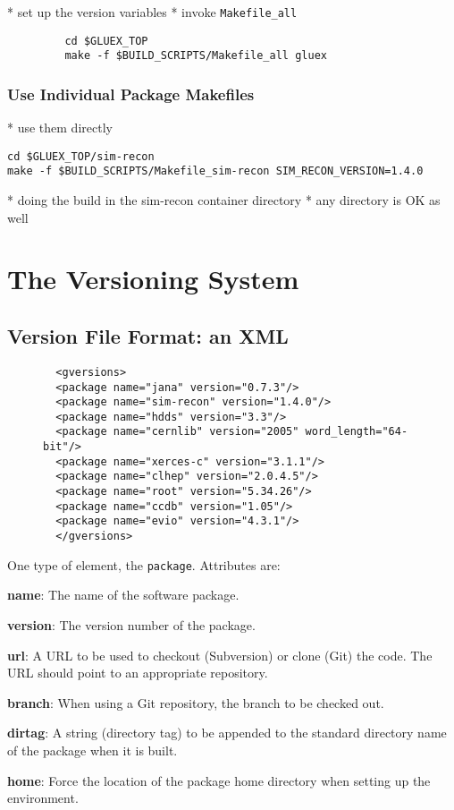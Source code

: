\documentclass[12pt]{article}
\begin{document}
* set up the version variables
* invoke {\tt Makefile\_all}

\begin{verbatim}
         cd $GLUEX_TOP
         make -f $BUILD_SCRIPTS/Makefile_all gluex
\end{verbatim}

\subsubsection{Use Individual Package Makefiles}

* use them directly

\begin{verbatim}
cd $GLUEX_TOP/sim-recon
make -f $BUILD_SCRIPTS/Makefile_sim-recon SIM_RECON_VERSION=1.4.0
\end{verbatim}

* doing the build in the sim-recon container directory
* any directory is OK as well

\section{The Versioning System}\label{section:versioning}

\subsection{Version File Format: an XML}

\begin{figure}
\begin{verbatim}
  <gversions>
  <package name="jana" version="0.7.3"/>
  <package name="sim-recon" version="1.4.0"/>
  <package name="hdds" version="3.3"/>
  <package name="cernlib" version="2005" word_length="64-bit"/>
  <package name="xerces-c" version="3.1.1"/>
  <package name="clhep" version="2.0.4.5"/>
  <package name="root" version="5.34.26"/>
  <package name="ccdb" version="1.05"/>
  <package name="evio" version="4.3.1"/>
  </gversions>
\end{verbatim}
\end{figure}

One type of element, the {\tt package}. Attributes are:

\begin{description}
\item{\bf name}: The name of the software package.
\item{\bf version}: The version number of the package.
\item{\bf url}: A URL to be used to checkout (Subversion) or clone
  (Git) the code. The URL should point to an appropriate repository.
\item{\bf branch}: When using a Git repository, the branch to be
  checked out.
\item{\bf dirtag}: A string (directory tag) to be appended to the
  standard directory name of the package when it is built.
\item{\bf home}: Force the location of the package home directory when setting up the environment.
\end{description}
\end{document}
